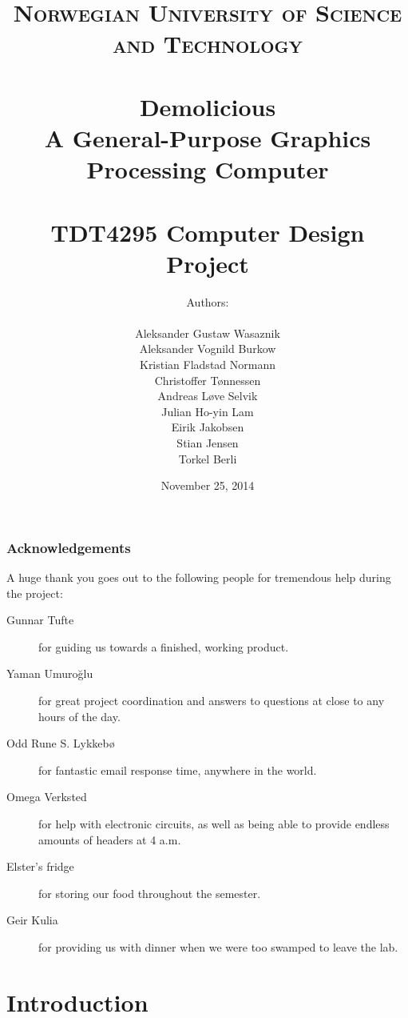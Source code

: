 \documentclass[a4paper, fontsize=11pt]{report} %
\title{ 
\normalfont \normalsize 
\textsc{Norwegian University of Science and Technology} \\ [25pt] %
\horrule{0.5pt} \\[0.4cm] %
\huge \textbf{Demolicious} \\ %
A General-Purpose Graphics Processing Computer \\
\horrule{2pt} \\[0.5cm] %
\large TDT4295 Computer Design Project \\
}
\author{Authors:\\ \\
Aleksander Gustaw Wasaznik\\
Aleksander Vognild Burkow\\
Kristian Fladstad Normann\\
Christoffer Tønnessen\\
Andreas Løve Selvik\\
Julian Ho-yin Lam\\
Eirik Jakobsen\\
Stian Jensen\\
Torkel Berli}
\date{\normalsize November 25, 2014}
\begin{document}

\maketitle

\newpage



\thispagestyle{firststyle}



\newpage

\vspace*{\fill}
\section*{Acknowledgements}
A huge thank you goes out to the following people for tremendous help during the project:

\begin{description}

    \item[Gunnar Tufte]
        for guiding us towards a finished, working product.
    \item[Yaman Umuroğlu]
        for great project coordination and answers to questions at close to any hours of the day.
    \item[Odd Rune S. Lykkebø]
        for fantastic email response time, anywhere in the world.
    \item[Omega Verksted]
        for help with electronic circuits, as well as being able to provide endless amounts of headers at 4 a.m.
    \item[Elster's fridge]
        for storing our food throughout the semester.
    \item[Geir Kulia]
        for providing us with dinner when we were too swamped to leave the lab.

\end{description}
\vspace*{\fill}

\newpage

\tableofcontents

\setcounter{secnumdepth}{3}

\newpage


\part{Introduction}
\end{document}
